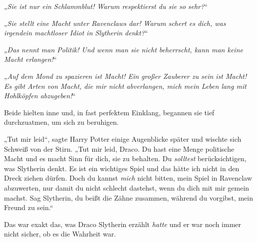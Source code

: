 „\emph{Sie ist nur ein Schlammblut! Warum respektierst du sie so sehr?}“

„\emph{Sie stellt eine Macht unter Ravenclaws dar! Warum schert es dich, was irgendein machtloser Idiot in Slytherin denkt?}“

„\emph{Das nennt man Politik! Und wenn man sie nicht beherrscht, kann man keine Macht erlangen!}“

„\emph{Auf dem Mond zu spazieren ist Macht! Ein großer Zauberer zu sein ist Macht! Es gibt Arten von Macht, die mir nicht abverlangen, mich mein Leben lang mit Hohlköpfen abzugeben!}“

Beide hielten inne und, in fast perfektem Einklang, begannen sie tief durchzuatmen, um sich zu beruhigen.

„Tut mir leid“, sagte Harry Potter einige Augenblicke später und wischte sich Schweiß von der Stirn.
„Tut mir leid, Draco. Du hast eine Menge politische Macht und es macht Sinn für dich, sie zu behalten. Du \emph{solltest} berücksichtigen, was Slytherin denkt. Es ist ein wichtiges Spiel und das hätte ich nicht in den Dreck ziehen dürfen. Doch du kannst \emph{mich} nicht bitten, mein Spiel in Ravenclaw abzuwerten, nur damit du nicht schlecht dastehst, wenn du dich mit mir gemein machst. Sag Slytherin, du beißt die Zähne zusammen, während du vorgibst, mein Freund zu sein.“

Das war exakt das, was Draco Slytherin erzählt \emph{hatte} und er war noch immer nicht sicher, ob es die Wahrheit war.

